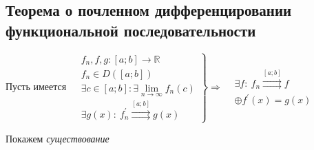 \documentclass[a4paper]{article}
\begin{document}
\subsection{Теорема о почленном дифференцировании функциональной последовательности}
\theorem Пусть имеется $\left.\begin{aligned}
    &f_n,f,g:[a;b]\to\mathbb{R}\\
    &f_n\in D([a;b])\\
    &\exists c\in[a;b]:\exists\lim\limits_{n\to\infty} f_n(c)\\
    &\exists g(x):\ f^{\prime}_n\overset{[a;b]}{\rightrightarrows}g(x)
\end{aligned}\right\}\Longrightarrow \begin{aligned}
    &\exists f:\ f_n\overset{[a;b]}{\rightrightarrows}f\\
    &\oplus f^{\prime}(x)=g(x)
\end{aligned}$

\proof Покажем \textit{существование}
    
\end{document}
